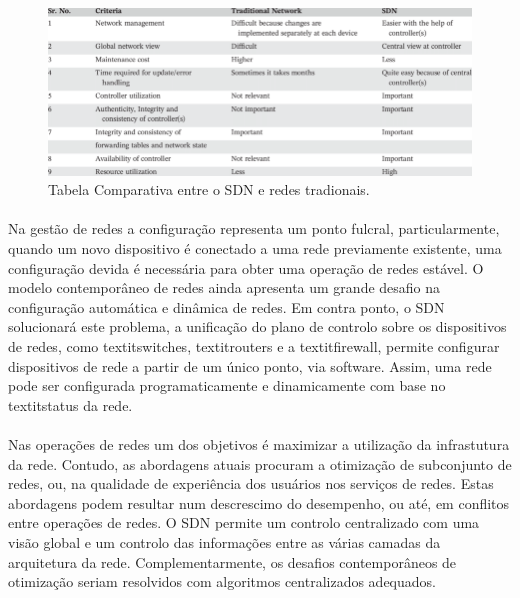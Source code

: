 \documentclass{llncs}
\begin{document}
\paragraph{}
\begin{figure}
\begin{center}
\includegraphics[scale=0.40]{tabela.png} 
\end{center}
\caption{\label{fig:tabela}Tabela Comparativa entre o SDN e redes tradionais.}
\end{figure} 
\paragraph{}
Na gestão de redes a configuração representa um ponto fulcral, particularmente, quando um novo dispositivo é conectado a uma rede previamente existente, uma configuração
devida é necessária para obter uma operação de redes estável. O modelo contemporâneo de redes ainda apresenta um grande desafio na configuração automática e dinâmica de redes.
Em contra ponto, o SDN solucionará este problema, a unificação do plano de controlo sobre os dispositivos de redes, como textit{switches}, textit{routers} e a textit{firewall},
permite configurar dispositivos de rede a partir de um único ponto, via software. Assim, uma rede pode ser configurada programaticamente e dinamicamente com base no textit{status} da rede. \cite{paper1}
\paragraph{}
Nas operações de redes um dos objetivos é maximizar a utilização da infrastutura da rede. Contudo, as abordagens atuais procuram a otimização de subconjunto de redes, ou,
na qualidade de experiência dos usuários nos serviços de redes. Estas abordagens podem resultar num descrescimo do desempenho, ou até, em conflitos entre operações de redes. 
O SDN permite um controlo centralizado com uma visão global e um controlo das informações entre as várias camadas da arquitetura da rede. Complementarmente, os desafios contemporâneos
de otimização seriam resolvidos com algoritmos centralizados adequados.
\end{document}
